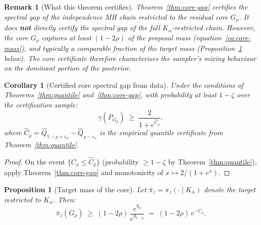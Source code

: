 \documentclass[11pt]{article}
\newtheorem{proposition}[theorem]{Proposition}
\newtheorem{corollary}[theorem]{Corollary}
\newtheorem{remark}[theorem]{Remark}
\begin{document}
\begin{remark}[What this theorem certifies]
Theorem~\ref{thm:core-gap} certifies the spectral gap of the independence MH chain \emph{restricted to the residual core $G_\rho$}. It does \textbf{not} directly certify the spectral gap of the full $K_\alpha$-restricted chain. However, the core $G_\rho$ captures at least $(1-2\rho)$ of the proposal mass (equation~\eqref{eq:core-mass}), and typically a comparable fraction of the target mass (Proposition~\ref{prop:target-mass} below). The core certificate therefore characterises the sampler's mixing behaviour on the dominant portion of the posterior.
\end{remark}


\begin{corollary}[Certified core spectral gap from data]\label{cor:certified}
Under the conditions of Theorems~\ref{thm:quantile} and~\ref{thm:core-gap}, with probability at least $1-\zeta$ over the certification sample:
\begin{equation}\label{eq:certified-gap}
  \gamma(P_{G_\rho}) \;\ge\; \frac{2}{1 + e^{\hat{C}_\rho}},
\end{equation}
where $\hat{C}_\rho = \hat{Q}_{1-\rho+\varepsilon_n} - \hat{Q}_{\rho-\varepsilon_n}$ is the empirical quantile certificate from Theorem~\ref{thm:quantile}.
\end{corollary}

\begin{proof}
On the event $\{C_\rho \le \hat{C}_\rho\}$ (probability $\ge 1-\zeta$ by Theorem~\ref{thm:quantile}), apply Theorem~\ref{thm:core-gap} and monotonicity of $x \mapsto 2/(1+e^x)$.
\end{proof}


\begin{proposition}[Target mass of the core]\label{prop:target-mass}
Let $\bar{\pi}_z = \pi_z(\cdot \mid K_\alpha)$ denote the target restricted to $K_\alpha$. Then:
\begin{equation}\label{eq:target-mass}
  \bar{\pi}_z(G_\rho) \;\ge\; (1-2\rho)\,\frac{e^{q_\rho}}{e^{q_{1-\rho}}}
  \;=\; (1 - 2\rho)\,e^{-C_\rho}.
\end{equation}
\end{proposition}
\end{document}
